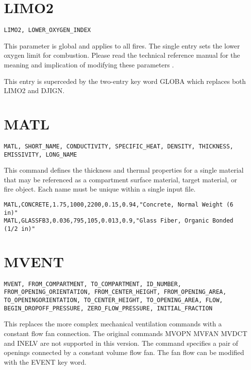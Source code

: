 \section{LIMO2}

\begin{lstlisting}
LIMO2, LOWER_OXYGEN_INDEX
\end{lstlisting}

This parameter is global and applies to all fires. The single entry sets the lower oxygen limit for combustion.  Please read the technical reference manual for the meaning and implication of modifying these parameters \cite{CFAST_Tech_Guide_7}.

This entry is superceded by the two-entry key word GLOBA which replaces both LIMO2 and DJIGN.

\section{MATL}

\begin{lstlisting}
MATL, SHORT_NAME, CONDUCTIVITY, SPECIFIC_HEAT, DENSITY, THICKNESS, EMISSIVITY, LONG_NAME
\end{lstlisting}

This command defines the thickness and thermal properties for a single material that may be referenced as a compartment surface material, target material, or fire object. Each name must be unique within a single input file.

\begin{lstlisting}
MATL,CONCRETE,1.75,1000,2200,0.15,0.94,"Concrete, Normal Weight (6 in)"
MATL,GLASSFB3,0.036,795,105,0.013,0.9,"Glass Fiber, Organic Bonded (1/2 in)"
\end{lstlisting}

\section{MVENT}

\begin{lstlisting}
MVENT, FROM_COMPARTMENT, TO_COMPARTMENT, ID_NUMBER, FROM_OPENING_ORIENTATION, FROM_CENTER_HEIGHT, FROM_OPENING_AREA, TO_OPENINGORIENTATION, TO_CENTER_HEIGHT, TO_OPENING_AREA, FLOW, BEGIN_DROPOFF_PRESSURE, ZERO_FLOW_PRESSURE, INITIAL_FRACTION
\end{lstlisting}

This replaces the more complex mechanical ventilation commands with a constant flow fan connection.  The original commands MVOPN MVFAN MVDCT and INELV are not supported in this version. The command specifies a pair of openings connected by a constant volume flow fan. The fan flow can be modified with the EVENT key word.


